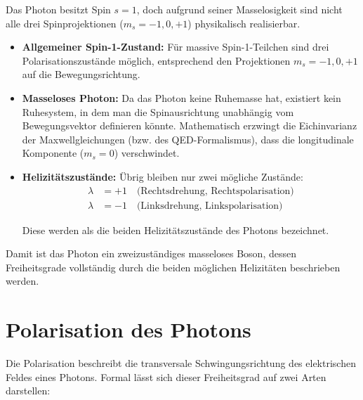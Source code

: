 Das Photon besitzt Spin $s=1$, doch aufgrund seiner Masselosigkeit sind nicht alle drei Spinprojektionen ($m_s=-1,0,+1$) physikalisch realisierbar. 

\begin{itemize}
	\item \textbf{Allgemeiner Spin-1-Zustand:}  
	Für massive Spin-1-Teilchen sind drei Polarisationszustände möglich, entsprechend den Projektionen $m_s=-1,0,+1$ auf die Bewegungsrichtung.
	
	\item \textbf{Masseloses Photon:}  
	Da das Photon keine Ruhemasse hat, existiert kein Ruhesystem, in dem man die Spinausrichtung unabhängig vom Bewegungsvektor definieren könnte.  
	Mathematisch erzwingt die Eichinvarianz der Maxwellgleichungen (bzw. des QED-Formalismus), dass die longitudinale Komponente ($m_s=0$) verschwindet.
	
	\item \textbf{Helizitätszustände:}  
	Übrig bleiben nur zwei mögliche Zustände:
	\begin{align*}
		\lambda& = +1 \quad \text{(Rechtsdrehung, Rechtspolarisation)}\\
		\lambda &= -1 \quad \text{(Linksdrehung, Linkspolarisation)}
	\end{align*}
	
	Diese werden als die beiden Helizitätszustände des Photons bezeichnet.
\end{itemize}

\noindent
Damit ist das Photon ein zweizuständiges masseloses Boson, dessen Freiheitsgrade vollständig durch die beiden möglichen Helizitäten beschrieben werden.

\section{Polarisation des Photons}
\label{anhangA:polarisation}

Die Polarisation beschreibt die transversale Schwingungsrichtung des elektrischen Feldes eines Photons. Formal lässt sich dieser Freiheitsgrad auf zwei Arten darstellen:

